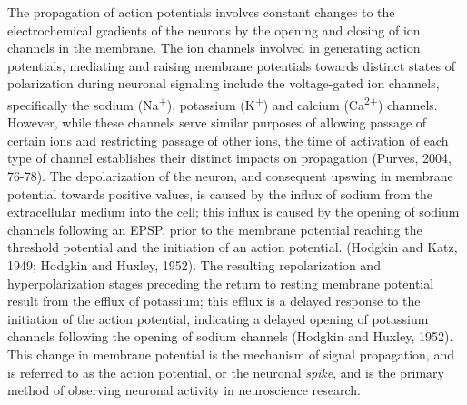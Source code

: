 \documentclass[11pt,titlepage]{article}
\begin{document}
The propagation of action potentials involves constant changes to the electrochemical gradients of the neurons by the opening and closing of ion channels in the membrane. The ion channels involved in generating action potentials, mediating and raising membrane potentials towards distinct states of polarization during neuronal signaling include the voltage-gated ion channels, specifically the sodium (Na\textsuperscript{+}), potassium (K\textsuperscript{+}) and calcium (Ca\textsuperscript{2+}) channels. However, while these channels serve similar purposes of allowing passage of certain ions and restricting passage of other ions, the time of activation of each type of channel establishes their distinct impacts on propagation (Purves, 2004, 76-78). The depolarization of the neuron, and consequent upswing in membrane potential towards positive values, is caused by the influx of sodium from the extracellular medium into the cell; this influx is caused by the opening of sodium channels following an EPSP, prior to the membrane potential reaching the threshold potential and the initiation of an action potential. (Hodgkin and Katz, 1949; Hodgkin and Huxley, 1952). The resulting repolarization and hyperpolarization stages preceding the return to resting membrane potential result from the efflux of potassium; this efflux is a delayed response to the initiation of the action potential, indicating a delayed opening of potassium channels following the opening of sodium channels (Hodgkin and Huxley, 1952). This change in membrane potential is the mechanism of signal propagation, and is referred to as the action potential, or the neuronal \textit{spike}, and is the primary method of observing neuronal activity in neuroscience research.\par
\end{document}
